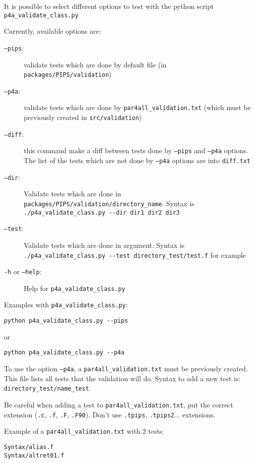 \documentclass[a4paper]{article}
\begin{document}
It is possible to select different options to test with the python script
\verb|p4a_validate_class.py|

Currently, available options are:
\begin{description}
\item[\texttt{--pips}:] validate tests which are done by default file (in
  \texttt{packages/PIPS/validation})

\item[\texttt{--p4a}:] validate tests which are done by
  \verb|par4all_validation.txt| (which must be previously created in
  \texttt{src/validation})

\item[\texttt{--diff}:] this command make a diff between tests done by
  \texttt{--pips} and \texttt{--p4a} options. The list of the tests which
  are not done by \texttt{--p4a} options are into \texttt{diff.txt}

\item[\texttt{--dir}:] Validate tests which are done in \verb|packages/PIPS/validation/directory_name|. Syntax is \verb|./p4a_validate_class.py --dir dir1 dir2 dir3|

\item[\texttt{--test}:] Validate tests which are done in argument. Syntax is \verb|./p4a_validate_class.py --test directory_test/test.f| for example

\item[\texttt{-h} or \texttt{--help}:] Help for \verb|p4a_validate_class.py|
\end{description}

Examples with \verb|p4a_validate_class.py|:
\begin{verbatim}
python p4a_validate_class.py --pips
\end{verbatim}
or
\begin{verbatim}
python p4a_validate_class.py --p4a
\end{verbatim}

To use the option \texttt{--p4a}, a \verb|par4all_validation.txt| must be
previously created. This file lists all tests that the validation will do.
Syntax to add a new test is: \verb|directory_test/name_test|.

Be careful when adding a test to \verb|par4all_validation.txt|, put the
correct extension (\texttt{.c}, \texttt{.f}, \texttt{.F},
\texttt{.F90}). Don't use \texttt{.tpips}, \texttt{.tpips2}... extensions.

Example of a \verb|par4all_validation.txt| with 2 tests:
\begin{verbatim}
Syntax/alias.f
Syntax/altret01.f
\end{verbatim}
\end{document}

